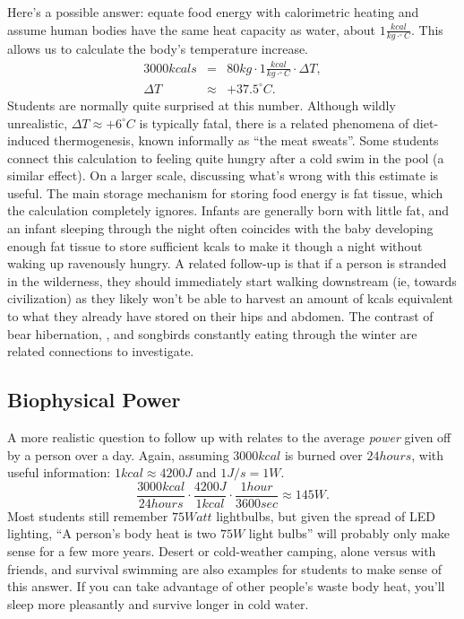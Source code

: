 \documentclass[onecolumn]{article}
\newcommand{\be}{\begin{equation}}
\newcommand{\ee}{\end{equation}}
\newcommand{\bea}{\begin{eqnarray}}
\newcommand{\eea}{\end{eqnarray}}
\newcommand{\degC}{^{\circ}C}
\begin{document}
Here's a possible answer:
equate food energy with calorimetric heating and assume human bodies have the same heat capacity as water, about $1\frac{kcal}{kg\cdot\degC}$. This allows us to calculate the body's temperature increase.
\bea
3000kcals &=& 80kg\cdot1 \frac{kcal}{kg\cdot \degC}\cdot\Delta T ,  \\
\Delta T &\approx& +37.5\degC . 
\eea
Students are normally quite surprised at this number.  Although wildly unrealistic, $\Delta T \approx +6\degC$ is typically fatal, there is a related phenomena of diet-induced thermogenesis,
\cite{meat_sweats}
known informally as ``the meat sweats''. Some students connect this calculation to feeling quite hungry after a cold swim in the pool (a similar effect).  On a larger scale, discussing what's wrong with this estimate is useful.  The main storage mechanism for storing food energy is fat tissue, which the calculation completely ignores.  Infants are generally born with little fat, and an infant sleeping through the night often coincides with the baby developing enough fat tissue to store sufficient kcals to make it though a night without waking up ravenously hungry.  A related follow-up is that if a person is stranded in the wilderness, they should immediately start walking downstream (ie, towards civilization) as they likely won't be able to harvest an amount of kcals equivalent to what they already have stored on their hips and abdomen. \cite{trout} The contrast of bear hibernation, \cite{fat_bear}, and songbirds constantly eating through the winter are related connections to investigate.

\subsection{Biophysical Power}
A more realistic question to follow up with relates to the average \textit{power} given off by a person over a day.  
Again, assuming $3000kcal$ is burned over $24 hours$, with useful information: $1 kcal \approx 4200J$ and $1 J/s=1W$.
\be
\frac{3000kcal}{24hours}\cdot\frac{4200J}{1kcal}\cdot\frac{1hour}{3600sec}\approx145W .
\ee
Most students still remember $75Watt$ lightbulbs, but given the spread of LED lighting, ``A person's body heat is two $75W$ light bulbs'' will probably only make sense for a few more years.  Desert or cold-weather camping, alone versus with friends, and survival swimming are also examples for students to make sense of this answer.  If you can take advantage of other people's waste body heat, you'll sleep more pleasantly and survive longer in cold water.  
\end{document}

